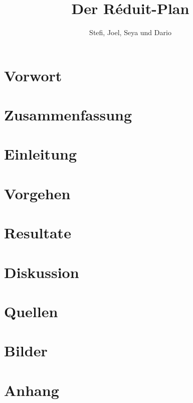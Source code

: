 \documentclass[opensans, a4paper]{article}
\title{Der Réduit-Plan}
\author{Stefi, Joel, Seya und Dario}
\begin{document}


\tableofcontents

\newpage

\section{Vorwort} \label{Vorwort}

\newpage 

\section{Zusammenfassung} \label{Zusammenfassung}

\newpage

\section{Einleitung} \label{Einleitung}

\newpage

\section{Vorgehen} \label{Vorgehen}

\newpage

\section{Resultate} \label{Resultate}

\newpage

\section{Diskussion} \label{Diskussion}

\newpage

\section{Quellen} \label{Quellen}
{ 
\printbibliography
}
\newpage

\section{Bilder} \label{Bilder}
\listoffigures
\newpage

\section{Anhang} \label{Anhang}

\end{document}
